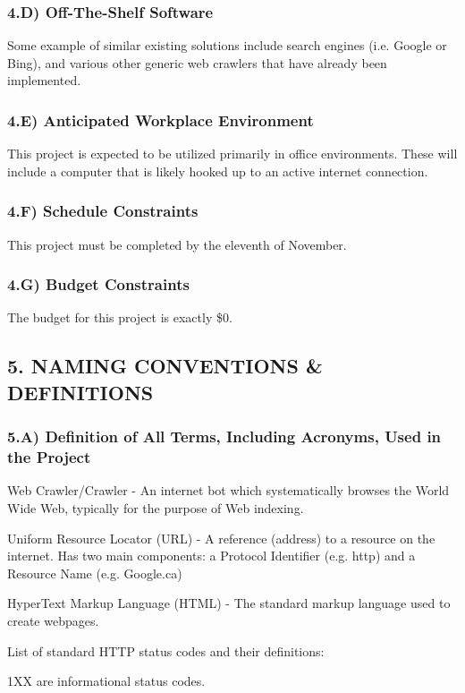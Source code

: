\documentclass[12pt]{article}
\begin{document}
\subsubsection{4.D) Off-The-Shelf Software}
Some example of similar existing solutions include search engines (i.e. Google or Bing), and various other generic web crawlers that have already been implemented.

\subsubsection{4.E) Anticipated Workplace Environment}
This project is expected to be utilized primarily in office environments. These will include a computer that is likely hooked up to an active internet connection.

\subsubsection{4.F) Schedule Constraints}
This project must be completed by the eleventh of November.

\subsubsection{4.G) Budget Constraints}
The budget for this project is exactly \$0.


\subsection{5. NAMING CONVENTIONS \& DEFINITIONS}

\subsubsection{5.A) Definition of All Terms, Including Acronyms, Used in the Project}
Web Crawler/Crawler - An internet bot which systematically browses the World Wide Web, typically for the purpose of Web indexing.

Uniform Resource Locator (URL) - A reference (address) to a resource on the internet. Has two main components: a Protocol Identifier (e.g. http) and a Resource Name (e.g. Google.ca)

HyperText Markup Language (HTML) - The standard markup language used to create webpages.

List of standard HTTP status codes and their definitions:

1XX are informational status codes.
\end{document}
